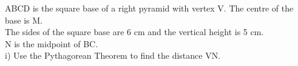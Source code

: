 \documentclass[preview]{standalone}
\begin{document}
\begin{center}
\begin{minipage}{12cm}\raggedright ABCD is the square base of a right pyramid with vertex V. The centre of the base is M.\\ The sides of the square base are 6 cm and the vertical height is 5 cm.\\ N is the midpoint of BC.\\ i) Use the Pythagorean Theorem to find the distance VN.\end{minipage}
\end{center}
\end{document}
